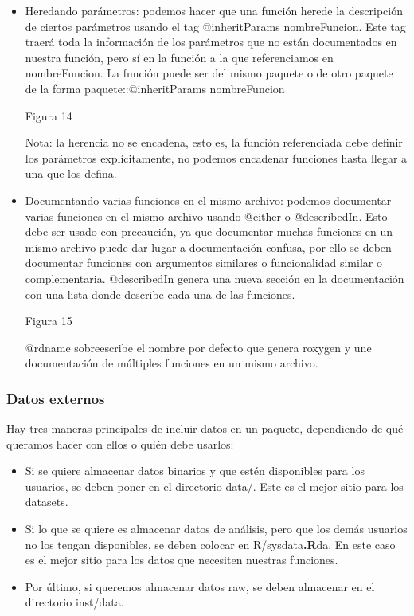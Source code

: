 \begin{itemize}
    \item Heredando par\'ametros: podemos hacer que una funci\'on herede la descripci\'on de
ciertos par\'ametros usando el tag @inheritParams nombreFuncion. Este tag traer\'a
toda la informaci\'on de los par\'ametros que no est\'an documentados en nuestra funci\'on,
pero s\'i en la funci\'on a la que referenciamos en nombreFuncion.
La funci\'on puede ser del mismo paquete o de otro paquete de la forma
paquete::@inheritParams nombreFuncion

Figura 14

Nota: la herencia no se encadena, esto es, la funci\'on referenciada debe definir los
par\'ametros expl\'icitamente, no podemos encadenar funciones hasta llegar a una que
los defina.
    \item Documentando varias funciones en el mismo archivo: podemos documentar
varias funciones en el mismo archivo usando @either o @describedIn. Esto debe ser
usado con precauci\'on, ya que documentar muchas funciones en un mismo archivo
puede dar lugar a documentaci\'on confusa, por ello se deben documentar funciones
con argumentos similares o funcionalidad similar o complementaria.
@describedIn genera una nueva secci\'on en la documentaci\'on con una lista donde
describe cada una de las funciones.

Figura 15

@rdname sobreescribe el nombre por defecto que genera roxygen y une
documentaci\'on de m\'ultiples funciones en un mismo archivo.
\end{itemize}

\subsubsection{Datos externos}

Hay tres maneras principales de incluir datos en un paquete, dependiendo de qu\'e queramos
hacer con ellos o qui\'en debe usarlos:

\begin{itemize}
    \item Si se quiere almacenar datos binarios y que est\'en disponibles para los usuarios, se
deben poner en el directorio data/. Este es el mejor sitio para los datasets.
    \item Si lo que se quiere es almacenar datos de an\'alisis, pero que los dem\'as usuarios no
los tengan disponibles, se deben colocar en R/sysdata\textbf{.R}da. En este caso es el mejor
sitio para los datos que necesiten nuestras funciones.
    \item Por \'ultimo, si queremos almacenar datos raw, se deben almacenar en el directorio
inst/data.
\end{itemize}

